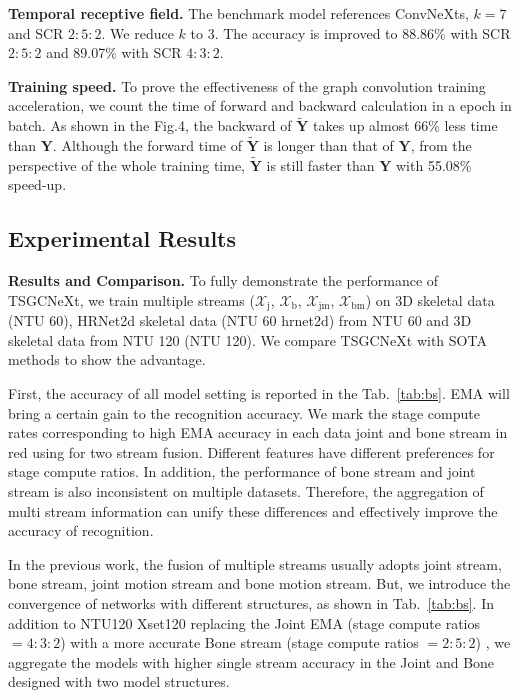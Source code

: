 \documentclass[10pt,twocolumn,letterpaper]{article}
\begin{document}
\noindent\textbf{Temporal receptive field.} The benchmark model references ConvNeXts, $k=7$ and SCR $2:5:2$. We reduce $k$ to 3. The accuracy is improved to 88.86\% with SCR $2:5:2$ and 89.07\% with SCR $4:3:2$.

\noindent\textbf{Training speed.} To prove the effectiveness of the graph convolution training acceleration, we count the time of forward and backward calculation in a epoch in batch. As shown in the Fig.4, the backward of $\mathbf{\tilde{Y}}$ takes up almost 66\% 
less time than $\mathbf{Y}$. Although the forward time of $\mathbf{\tilde{Y}}$ is longer than that of $\mathbf{Y}$, from the perspective of the whole training time, $\mathbf{\tilde{Y}}$ is still faster than $\mathbf{Y}$ with 55.08\% speed-up.

\subsection{Experimental Results}
\label{er}
\noindent\textbf{Results and Comparison.} To fully demonstrate the performance of TSGCNeXt, we train multiple streams (${{\mathcal{X}}_{\text{j}}}$, ${{\mathcal{X}}_{\text{b}}}$, ${{\mathcal{X}}_{\text{jm}}}$, ${{\mathcal{X}}_{\text{bm}}}$) on 3D skeletal data (NTU 60), HRNet2d skeletal data (NTU 60 hrnet2d) from NTU 60 and 3D skeletal data from NTU 120 (NTU 120). We compare TSGCNeXt with SOTA methods to show the advantage. 

First, the accuracy of all model setting is reported in the Tab.~\ref{tab:bs}.  EMA will bring a certain gain to the recognition accuracy. We mark the stage compute rates corresponding to high EMA accuracy in each data joint and bone stream in red using for two stream fusion. Different features have different preferences for stage compute ratios. In addition, the performance of bone stream and joint stream is also inconsistent on multiple datasets. Therefore, the aggregation of multi stream information can unify these differences and effectively improve the accuracy of recognition.

In the previous work, the fusion of multiple streams usually adopts joint stream, bone stream, joint motion stream and bone motion stream. But, we introduce the convergence of networks with different structures, as shown in Tab.~\ref{tab:bs}. In addition to NTU120 Xset120 replacing the Joint EMA (stage compute ratios $=4:3:2$) with a more accurate Bone stream (stage compute ratios $=2:5:2$) , we aggregate the models with higher single stream accuracy in the Joint and Bone designed with two model structures.
\end{document}
